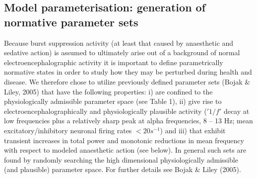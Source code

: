 \documentclass[a4paper,12pt]{article}
\begin{document}
\subsection{Model parameterisation: generation of normative parameter sets}
Because burst suppression activity (at least that caused by
anaesthetic and sedative action) is assumed to ultimately arise out of
a background of normal electroencephalographic activity it is
important to define parametrically normative states in order to study
how they may be perturbed during health and disease. We therefore
chose to utilize previously defined parameter sets (Bojak \& Liley,
2005) that have the following properties: i) are confined to the
physiologically admissible parameter space (see Table 1), ii) give rise
to electroencephalographically and physiologically plausible activity
($'1/f'$ decay at low frequencies plus a relatively sharp peak at alpha
frequencies, 8 – 13 Hz; mean excitatory/inhibitory neuronal firing rates
$< 20 s^{-1}$) and iii) that exhibit transient increases in total power and
monotonic reductions in mean frequency with respect to modeled
anaesthetic action (see below). In general such sets are found by
randomly searching the high dimensional physiologically admissible
(and plausible) parameter space. For further details see Bojak \& Liley
(2005).
\end{document}

